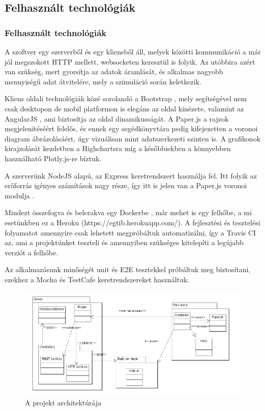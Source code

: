 \subsection{Felhasznált technológiák}
\begin{frame}
\frametitle{Felhasznált technológiák}
A szoftver egy szerverből és egy kliensből áll, melyek közötti kommunikáció a már jól megszokott HTTP mellett, websocketen keresztül is folyik. Az utóbbira azért van szükség, mert gyorsítja az adatok áramlását, és alkalmas nagyobb mennyiségű adat átvitelére, mely a szimuláció során keletkezik. 

Kliens oldali technológiák közé sorolandó a Bootstrap \cite{soft:bootstrap}, mely segítségével nem csak desktopon de mobil platformon is elegáns az oldal kinézete, valamint az AngularJS \cite{soft:angular}, ami biztosítja az oldal dinamikusságát. A Paper.js \cite{soft:paper} a rajzok megjelenítéséért felelős, és ennek egy segédkönyvtára \cite{soft:voronoiModule} pedig kifejezetten a voronoi diagram ábrázolásáért, úgy vizuálisan mint adatszerkezeti szinten is. A grafikonok kirajzolását kezdetben a Highchartsra \cite{soft:highcharts} míg a későbbiekben a könnyebben használható Plotly.js-re \cite{soft:plotly} bíztuk.

A szerverünk NodeJS \cite{soft:node} alapú, az Express \cite{soft:express} keretrendszert használja fel. Itt folyik az erőforrás igényes számítások nagy része, így itt is jelen van a Paper.js voronoi modulja \cite{soft:voronoiModule}.

Mindezt összefogva és belerakva egy Dockerbe \cite{soft:docker}, már mehet is egy felhőbe, a mi esetünkben ez a Heroku (https://egtib.herokuapp.com/). A fejlesztési és tesztelési folyamatot amennyire csak lehetett megpróbáltuk automatizálni, így a Travis CI \cite{soft:travis} az, ami a projektünket teszteli és amennyiben szükséges kitelepíti a legújabb verziót a felhőbe.

Az alkalmazásunk minőségét unit és E2E tesztekkel próbáltuk meg biztosítani, ezekhez a Mocha \cite{soft:mocha} és TestCafe \cite{soft:testcafe} keretrendszereket használtuk.

\begin{figure}[ht!]
	\centering
	\includegraphics[width=\linewidth]{images/Architecture}
	\caption{A projekt architektúrája\label{fig:Architecture}}
\end{figure}
\end{frame}
